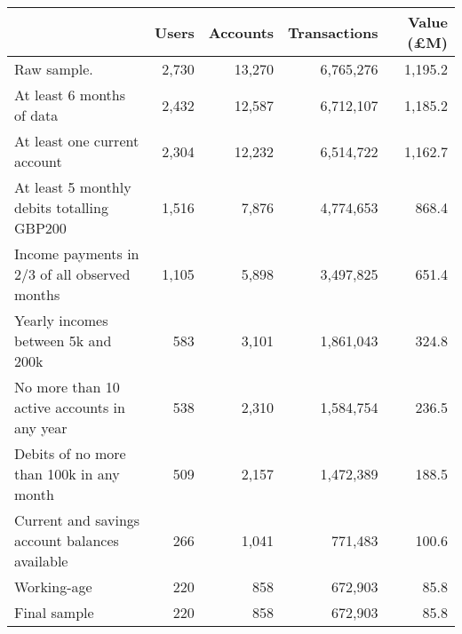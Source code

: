 \begin{tabular}{lrrrr}
\toprule
                                               & Users & Accounts & Transactions & Value (\pounds M) \\
\midrule
                                   Raw sample. & 2,730 &   13,270 &    6,765,276 &           1,195.2 \\
                     At least 6 months of data & 2,432 &   12,587 &    6,712,107 &           1,185.2 \\
                  At least one current account & 2,304 &   12,232 &    6,514,722 &           1,162.7 \\
    At least 5 monthly debits totalling GBP200 & 1,516 &    7,876 &    4,774,653 &             868.4 \\
 Income payments in 2/3 of all observed months & 1,105 &    5,898 &    3,497,825 &             651.4 \\
            Yearly incomes between 5k and 200k &   583 &    3,101 &    1,861,043 &             324.8 \\
   No more than 10 active accounts in any year &   538 &    2,310 &    1,584,754 &             236.5 \\
      Debits of no more than 100k in any month &   509 &    2,157 &    1,472,389 &             188.5 \\
Current and savings account balances available &   266 &    1,041 &      771,483 &             100.6 \\
                                   Working-age &   220 &      858 &      672,903 &              85.8 \\
                                  Final sample &   220 &      858 &      672,903 &              85.8 \\
\bottomrule
\end{tabular}
